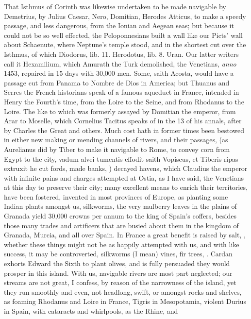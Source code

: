 {That Isthmus of Corinth was likewise undertaken to be made navigable by
Demetrius, by Julius Caesar, Nero, Domitian, Herodes Atticus, to make a
speedy passage, and less dangerous, from the Ionian and Aegean
seas; but because it could not be so well effected, the Peloponnesians
built a wall like our Picts' wall about Schaenute, where Neptune's
temple stood, and in the shortest cut over the Isthmus, of which
Diodorus, lib. 11. Herodotus, lib. 8. Uran. Our latter writers call it
Hexamilium, which Amurath the Turk demolished, the Venetians, \emph{anno}
1453, repaired in 15 days with 30,000 men. Some, saith Acosta, would
have a passage cut from Panama to Nombre de Dios in America; but
Thuanus and Serres the French historians speak of a famous aqueduct in
France, intended in Henry the Fourth's time, from the Loire to the
Seine, and from Rhodanus to the Loire. The like to which was formerly
assayed by Domitian the emperor, from Arar to Moselle, which
Cornelius Tacitus speaks of in the 13 of his annals, after by Charles
the Great and others. Much cost hath in former times been bestowed in
either new making or mending channels of rivers, and their passages,
(as Aurelianus did by Tiber to make it navigable to Rome, to convey
corn from Egypt to the city, vadum alvei tumentis effodit saith
Vopiscus, et Tiberis ripas extruxit he cut fords, made banks, \etc{})
decayed havens, which Claudius the emperor with infinite pains and
charges attempted at Ostia, as I have said, the Venetians at this day
to preserve their city; many excellent means to enrich their
territories, have been fostered, invented in most provinces of Europe,
as planting some Indian plants amongst us, silkworms, the very
mulberry leaves in the plains of Granada yield 30,000 crowns per annum
to the king of Spain's coffers, besides those many trades and
artificers that are busied about them in the kingdom of Granada,
Murcia, and all over Spain. In France a great benefit is raised by
salt, \etc{}, whether these things might not be as happily attempted with
us, and with like success, it may be controverted, silkworms (I mean)
vines, fir trees, \etc{}. Cardan exhorts Edward the Sixth to plant olives,
and is fully persuaded they would prosper in this island. With us,
navigable rivers are most part neglected; our streams are not great, I
confess, by reason of the narrowness of the island, yet they run
smoothly and even, not headlong, swift, or amongst rocks and shelves,
as foaming Rhodanus and Loire in France, Tigris in Mesopotamia, violent
Durius in Spain, with cataracts and whirlpools, as the Rhine, and
}
